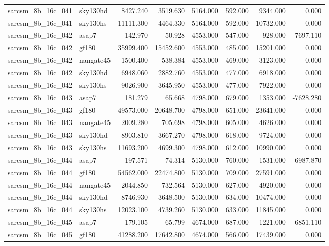 \begin{tabular}{llrrrrrr}
sarcsm\_8b\_16c\_041 & sky130hd & 8427.240 & 3519.630 & 5164.000 & 592.000 & 9344.000 & 0.000 \\
sarcsm\_8b\_16c\_041 & sky130hs & 11111.300 & 4464.330 & 5164.000 & 592.000 & 10732.000 & 0.000 \\
sarcsm\_8b\_16c\_042 & asap7 & 142.970 & 50.928 & 4553.000 & 547.000 & 928.000 & -7697.110 \\
sarcsm\_8b\_16c\_042 & gf180 & 35999.400 & 15452.600 & 4553.000 & 485.000 & 15201.000 & 0.000 \\
sarcsm\_8b\_16c\_042 & nangate45 & 1500.400 & 538.384 & 4553.000 & 469.000 & 3123.000 & 0.000 \\
sarcsm\_8b\_16c\_042 & sky130hd & 6948.060 & 2882.760 & 4553.000 & 477.000 & 6918.000 & 0.000 \\
sarcsm\_8b\_16c\_042 & sky130hs & 9026.900 & 3645.950 & 4553.000 & 477.000 & 7922.000 & 0.000 \\
sarcsm\_8b\_16c\_043 & asap7 & 181.279 & 65.668 & 4798.000 & 679.000 & 1353.000 & -7628.280 \\
sarcsm\_8b\_16c\_043 & gf180 & 49573.000 & 20648.700 & 4798.000 & 651.000 & 23641.000 & 0.000 \\
sarcsm\_8b\_16c\_043 & nangate45 & 2009.280 & 705.698 & 4798.000 & 605.000 & 4626.000 & 0.000 \\
sarcsm\_8b\_16c\_043 & sky130hd & 8903.810 & 3667.270 & 4798.000 & 618.000 & 9724.000 & 0.000 \\
sarcsm\_8b\_16c\_043 & sky130hs & 11693.200 & 4699.300 & 4798.000 & 612.000 & 10990.000 & 0.000 \\
sarcsm\_8b\_16c\_044 & asap7 & 197.571 & 74.314 & 5130.000 & 760.000 & 1531.000 & -6987.870 \\
sarcsm\_8b\_16c\_044 & gf180 & 54562.000 & 22474.800 & 5130.000 & 709.000 & 27591.000 & 0.000 \\
sarcsm\_8b\_16c\_044 & nangate45 & 2044.850 & 732.564 & 5130.000 & 627.000 & 4920.000 & 0.000 \\
sarcsm\_8b\_16c\_044 & sky130hd & 8746.930 & 3648.500 & 5130.000 & 634.000 & 10474.000 & 0.000 \\
sarcsm\_8b\_16c\_044 & sky130hs & 12023.100 & 4739.260 & 5130.000 & 633.000 & 11845.000 & 0.000 \\
sarcsm\_8b\_16c\_045 & asap7 & 179.105 & 65.799 & 4674.000 & 687.000 & 1221.000 & -6851.110 \\
sarcsm\_8b\_16c\_045 & gf180 & 41288.200 & 17642.800 & 4674.000 & 566.000 & 17439.000 & 0.000 \\

\end{tabular}
